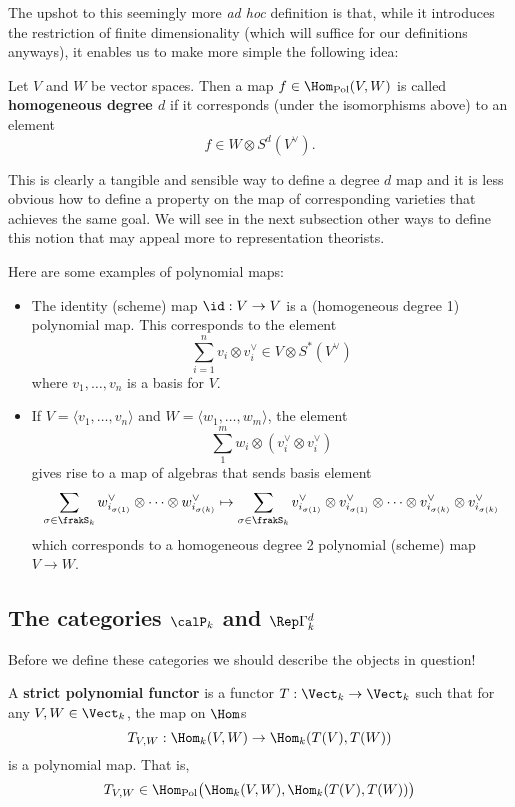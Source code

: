\documentclass[12pt]{article}
\begin{document}
The upshot to this seemingly more \textit{ad hoc} definition is that, while it introduces the restriction of finite dimensionality (which will suffice for our 
definitions anyways), it enables us to make more simple the following idea:
\begin{defn}\label{def:homog-poly-map}
	Let $V$ and $W$ be vector spaces. Then a map $f\in \Hom_\text{Pol}(V,W)$ is called \textbf{homogeneous degree $d$} if 
	it corresponds (under the isomorphisms above) to an element 
	\[f\in W\otimes S^d(V^\vee).\]
\end{defn}
This is clearly a tangible and sensible way to define a degree $d$ map and it is less obvious how to define a property 
on the map of corresponding varieties that achieves the same goal. We will see in the next subsection other ways to define this 
notion that may appeal more to representation theorists.
\begin{ex}
	Here are some examples of polynomial maps:
	\begin{itemize}
		\item The identity (scheme) map $\id:V\to V$ is a (homogeneous degree 1) polynomial map. This corresponds to the element 
		\[\sum_{i=1}^n v_i\otimes v_i^\vee\in V\otimes S^\ast(V^\vee)\]
		where $v_1,\dots,v_n$ is a basis for $V$.
		\item If $V=\langle v_1,\dots,v_n\rangle$ and $W=\langle w_1,\dots,w_m\rangle$, the element
		\[\sum_1^m w_i\otimes (v_i^\vee\otimes v_i^\vee)\]
		gives rise to a map of algebras that sends basis element
		\[\sum_{\sigma\in\frakS_k}w_{i_{\sigma(1)}}^\vee\otimes \cdots\otimes w_{i_{\sigma(k)}}^\vee\mapsto \sum_{\sigma\in\frakS_k}v_{i_{\sigma(1)}}^\vee\otimes v_{i_{\sigma(1)}}^\vee\otimes \cdots\otimes v_{i_{\sigma(k)}}^\vee\otimes v_{i_{\sigma(k)}}^\vee\]
		which corresponds to a homogeneous degree 2 polynomial (scheme) map $V\to W$.
	\end{itemize}
\end{ex}

\subsection{The categories \texorpdfstring{$\calP_k$}{Pk} and \texorpdfstring{$\Rep \Gamma^d_k$}{Rep Gdk}}
Before we define these categories we should describe the objects in question!
\begin{defn}
	A \textbf{strict polynomial functor} is a functor $T:\Vect_k\to \Vect_k$ such that for any $V,W\in\Vect_k$,
	the map on $\Hom$s
	\[T_{V,W}:\Hom_k(V,W)\to \Hom_k(T(V),T(W))\]
	is a polynomial map. That is,
	\[T_{V,W}\in\Hom_\text{Pol}\big(\Hom_k(V,W), \Hom_k(T(V),T(W))\big)\]
\end{defn}
\end{document}
